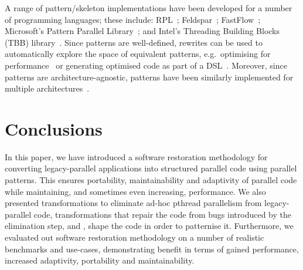A range of pattern/skeleton implementations have been developed for a number of programming languages; these include: RPL~\cite{DBLP:conf/pdp/JanjicBMHDAG16}; Feldspar~\cite{DBLP:conf/ifl/AxelssonCSSEP10}; FastFlow~\cite{DBLP:journals/mis/JinLWY15}; Microsoft's Pattern Parallel Library~\cite{ACM:book/msoft/CampbellM11}; and Intel's Threading Building Blocks (TBB) library~\cite{DBLP:reference/parallel/X11pz}.
Since patterns are well-defined, rewrites can be used to automatically explore the space of equivalent patterns, e.g.\ optimising for performance~\cite{DBLP:conf/europar/MatsuzakiKIHA04,DBLP:conf/ipps/GorlatchWL99} or generating optimised code as part of a DSL~\cite{DBLP:conf/dagstuhl/Gorlatch03}. Moreover, since patterns are architecture-agnostic, patterns have been similarly implemented for multiple architectures~\cite{DBLP:conf/cgo/HagedornSSGD18,DBLP:conf/parco/ReyesL15}.

\section{Conclusions} \label{sec:Conclusions} 
In this paper, we have introduced a software restoration methodology for converting legacy-parallel applications into structured parallel code using parallel patterns. This ensures portability, maintainability and adaptivity of parallel code while maintaining, and sometimes even increasing, performance. We also presented transformations to eliminate ad-hoc pthread parallelism from legacy-parallel code, transformations that repair the code from bugs introduced by the elimination step, and , shape the code in order to patternise it. Furthermore, we evaluated out software restoration methodology on a number of realistic benchmarks and use-cases, demonstrating benefit in terms of gained performance, increased adaptivity, portability and maintainability.






